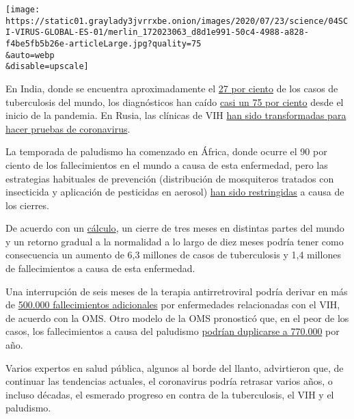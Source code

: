 \texttt{[image: https://static01.graylady3jvrrxbe.onion/images/2020/07/23/science/04SCI-VIRUS-GLOBAL-ES-01/merlin\_172023063\_d8d1e991-50c4-4988-a828-f4be5fb5b26e-articleLarge.jpg?quality=75\\\&auto=webp\\\&disable=upscale]}

En India, donde se encuentra aproximadamente el
\href{https://www.who.int/tb/publications/global_report/gtbr2018_main_text_28Feb2019.pdf}{27
por ciento} de los casos de tuberculosis del mundo, los diagnósticos han
caído \href{https://reports.nikshay.in/Reports/TBNotification}{casi un
75 por ciento} desde el inicio de la pandemia. En Rusia, las clínicas de
VIH
\href{https://www.unaids.org/en/resources/presscentre/featurestories/2020/may/20200514_russian-federation-covid19}{han
sido transformadas para hacer pruebas de coronavirus}.

La temporada de paludismo ha comenzado en África, donde ocurre el 90 por
ciento de los fallecimientos en el mundo a causa de esta enfermedad,
pero las estrategias habituales de prevención (distribución de
mosquiteros tratados con insecticida y aplicación de pesticidas en
aerosol)
\href{https://www.who.int/emergencies/diseases/novel-coronavirus-2019/question-and-answers-hub/q-a-detail/malaria-and-the-covid-19-pandemic}{han
sido restringidas} a causa de los cierres.

De acuerdo con un
\href{http://www.stoptb.org/assets/documents/news/Modeling\%20Report_1\%20May\%202020_FINAL.pdf}{cálculo},
un cierre de tres meses en distintas partes del mundo y un retorno
gradual a la normalidad a lo largo de diez meses podría tener como
consecuencia un aumento de 6,3 millones de casos de tuberculosis y 1,4
millones de fallecimientos a causa de esta enfermedad.

Una interrupción de seis meses de la terapia antirretroviral podría
derivar en más de
\href{https://www.who.int/es/news-room/detail/11-05-2020-the-cost-of-inaction-covid-19-related-service-disruptions-could-cause-hundreds-of-thousands-of-extra-deaths-from-hiv}{500.000
fallecimientos adicionales} por enfermedades relacionadas con el VIH, de
acuerdo con la OMS. Otro modelo de la OMS pronosticó que, en el peor de
los casos, los fallecimientos a causa del paludismo
\href{https://www.who.int/publications/i/item/the-potential-impact-of-health-service-disruptions-on-the-burden-of-malaria}{podrían
duplicarse a 770.000} por año.

Varios expertos en salud pública, algunos al borde del llanto,
advirtieron que, de continuar las tendencias actuales, el coronavirus
podría retrasar varios años, o incluso décadas, el esmerado progreso en
contra de la tuberculosis, el VIH y el paludismo.

